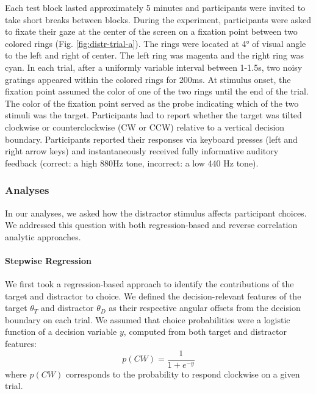 \documentclass[a4paper, nobind]{templates/ociamthesis}
\begin{document}
Each test block lasted approximately 5 minutes and participants were invited to take short breaks between blocks. During the experiment, participants were asked to fixate their gaze at the center of the screen on a fixation point between two colored rings (Fig. \ref{fig:distr-trial-a}). The rings were located at 4° of visual angle to the left and right of center. The left ring was magenta and the right ring was cyan. In each trial, after a uniformly variable interval between 1-1.5s, two noisy gratings appeared within the colored rings for 200ms. At stimulus onset, the fixation point assumed the color of one of the two rings until the end of the trial. The color of the fixation point served as the probe indicating which of the two stimuli was the target. Participants had to report whether the target was tilted clockwise or counterclockwise (CW or CCW) relative to a vertical decision boundary. Participants reported their responses via keyboard presses (left and right arrow keys) and instantaneously received fully informative auditory feedback (correct: a high 880Hz tone, incorrect: a low 440 Hz tone).

\hypertarget{analyses-1}{%
\subsubsection{Analyses}\label{analyses-1}}

In our analyses, we asked how the distractor stimulus affects participant choices. We addressed this question with both regression-based and reverse correlation analytic approaches.

\hypertarget{stepwise-regression}{%
\paragraph{Stepwise Regression}\label{stepwise-regression}}

We first took a regression-based approach to identify the contributions of the target and distractor to choice. We defined the decision-relevant features of the target \(\theta_T\) and distractor \(\theta_D\) as their respective angular offsets from the decision boundary on each trial. We assumed that choice probabilities were a logistic function of a decision variable \(y\), computed from both target and distractor features:
\begin{equation}
p(CW) = \frac{1}{1+e^{-y}}
\label{eq:distr-y}
\end{equation}
where \(p(CW)\) corresponds to the probability to respond clockwise on a given trial.
\end{document}
